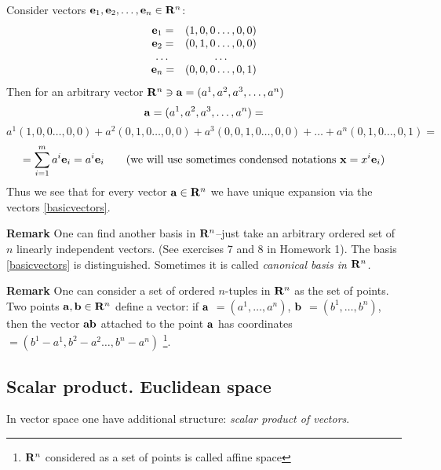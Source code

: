 \documentclass[12pt]{article}
\numberwithin{equation}{section}
\begin{document}
Consider vectors ${\bf e}_1,{\bf e}_2,\dots,{\bf e}_n\in {\bf R}^n$:
                  \begin{equation}\label{basicvectors}
                  \begin{array}{cc}
                    {\bf e}_1=& (1,0,0\dots,0,0) \\
                    {\bf e}_2=& (0,1,0\dots,0,0) \\
                    \dots & \dots \\
                    {\bf e}_n=& (0,0,0\dots,0,1) \\
                  \end{array}
                  \end{equation}
Then for an arbitrary vector   ${\bf R}^n\ni {\bf a}=(a^1,a^2,a^3,\dots,a^n)$
                     $$
            {\bf a}=(a^1,a^2,a^3,\dots,a^n)=
                      $$
                      $$
                      a^1(1,0,0\dots,0,0)+a^2(0,1,0\dots,0,0)+
            a^3(0,0,1,0\dots,0,0)+\dots+a^n(0,1,0\dots,0,1)=
                         $$
                         $$
            =\sum_{i=1}^m a^i{\bf e}_i=a^i{\bf e}_i \qquad \hbox{(we will use sometimes condensed notations}\,\, {\bf x}= x^i{\bf e}_i)
                            $$
Thus we see that for every vector ${\bf a}\in {\bf R}^n$ we have 
unique expansion via the vectors
 \eqref{basicvectors}.

{\bf Remark} One can find
   another basis in ${\bf R}^n$--just take an arbitrary ordered set of $n$  linearly independent vectors.
   (See exercises 7 and 8 in  Homework 1).
 The basis \eqref{basicvectors} is distinguished. 
Sometimes it is called {\it canonical basis in ${\bf R}^n$.}



\m


{\bf Remark} One can consider a set of ordered $n$-tuples in ${\bf R}^n$ as the set of
points.
   Two points
   ${\bf a,b}\in {\bf R}^n$ define a vector:
   if $\bf a$ $=(a^1,\dots,a^n)$, $\bf b$ $=(b^1,\dots,b^n)$, then
   the vector $\bf ab$ attached to the point $\bf a$
   has coordinates $=(b^1-a^1,b^2-a^2\dots,b^n-a^n)$
   \footnote{${\bf R}^n$ considered as a set of points is called affine space}.


\subsection {Scalar product. Euclidean space}

In vector space one have additional structure: {\it scalar product of vectors}.
\end{document}
